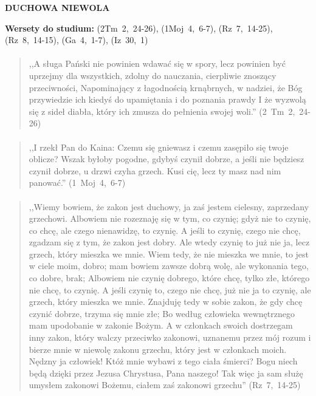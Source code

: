 \documentclass[10pt,a4paper,oneside]{article}
\begin{document}
\centerline{\textbf{\MakeUppercase{Duchowa niewola}}}
\begin{center}
\textbf{Wersety do studium:} 
\mbox{(2Tm 2, 24-26)}, \mbox{(1Moj 4, 6-7)}, \mbox{(Rz 7, 14-25)}, \mbox{(Rz 8, 14-15)}, \mbox{(Ga 4, 1-7)}, \mbox{(Iz 30, 1)}
\end{center}
\paragraph{}
\begin{quote}
,,A sługa Pański nie powinien wdawać się w spory, lecz powinien być uprzejmy dla wszystkich, zdolny do nauczania, cierpliwie znoszący przeciwności, Napominający z łagodnością krnąbrnych, w nadziei, że Bóg przywiedzie ich kiedyś do upamiętania i do poznania prawdy I że wyzwolą się z sideł diabła, który ich zmusza do pełnienia swojej woli.'' \mbox{(2 Tm 2, 24-26)}
\end{quote}
\paragraph{}
\begin{quote}
,,I rzekł Pan do Kaina: Czemu się gniewasz i czemu zasępiło się twoje oblicze? Wszak byłoby pogodne, gdybyś czynił dobrze, a jeśli nie będziesz czynił dobrze, u drzwi czyha grzech. Kusi cię, lecz ty masz nad nim panować.'' \mbox{(1 Moj 4, 6-7)}
\end{quote}
\paragraph{}
\begin{quote}
,,Wiemy bowiem, że zakon jest duchowy, ja zaś jestem cielesny, zaprzedany grzechowi. Albowiem nie rozeznaję się w tym, co czynię; gdyż nie to czynię, co chcę, ale czego nienawidzę, to czynię. A jeśli to czynię, czego nie chcę, zgadzam się z tym, że zakon jest dobry. Ale wtedy czynię to już nie ja, lecz grzech, który mieszka we mnie. Wiem tedy, że nie mieszka we mnie, to jest w ciele moim, dobro; mam bowiem zawsze dobrą wolę, ale wykonania tego, co dobre, brak; Albowiem nie czynię dobrego, które chcę, tylko złe, którego nie chcę, to czynię. A jeśli czynię to, czego nie chcę, już nie ja to czynię, ale grzech, który mieszka we mnie. Znajduję tedy w sobie zakon, że gdy chcę czynić dobrze, trzyma się mnie złe; Bo według człowieka wewnętrznego mam upodobanie w zakonie Bożym. A w członkach swoich dostrzegam inny zakon, który walczy przeciwko zakonowi, uznanemu przez mój rozum i bierze mnie w niewolę zakonu grzechu, który jest w członkach moich. Nędzny ja człowiek! Któż mnie wybawi z tego ciała śmierci? Bogu niech będą dzięki przez Jezusa Chrystusa, Pana naszego! Tak więc ja sam służę umysłem zakonowi Bożemu, ciałem zaś zakonowi grzechu'' \mbox{(Rz 7, 14-25)}
\end{quote}
\end{document}
